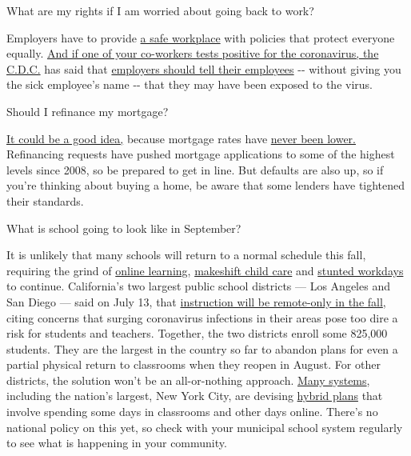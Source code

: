  What are my rights if I am worried about going back to work?

Employers have to provide
\href{https://www.osha.gov/SLTC/covid-19/standards.html}{a safe
workplace} with policies that protect everyone equally.
\href{https://www.nytimes.com/article/coronavirus-money-unemployment.html}{And
if one of your co-workers tests positive for the coronavirus, the
C.D.C.} has said that
\href{https://www.cdc.gov/coronavirus/2019-ncov/community/guidance-business-response.html}{employers
should tell their employees} -\/- without giving you the sick employee's
name -\/- that they may have been exposed to the virus.

 Should I refinance my mortgage?

\href{https://www.nytimes.com/article/coronavirus-money-unemployment.html}{It
could be a good idea,} because mortgage rates have
\href{https://www.nytimes.com/2020/07/16/business/mortgage-rates-below-3-percent.html}{never
been lower.} Refinancing requests have pushed mortgage applications to
some of the highest levels since 2008, so be prepared to get in line.
But defaults are also up, so if you're thinking about buying a home, be
aware that some lenders have tightened their standards.

 What is school going to look like in September?

It is unlikely that many schools will return to a normal schedule this
fall, requiring the grind of
\href{https://www.nytimes.com/2020/06/05/us/coronavirus-education-lost-learning.html}{online
learning},
\href{https://www.nytimes.com/2020/05/29/us/coronavirus-child-care-centers.html}{makeshift
child care} and
\href{https://www.nytimes.com/2020/06/03/business/economy/coronavirus-working-women.html}{stunted
workdays} to continue. California's two largest public school districts
--- Los Angeles and San Diego --- said on July 13, that
\href{https://www.nytimes.com/2020/07/13/us/lausd-san-diego-school-reopening.html}{instruction
will be remote-only in the fall}, citing concerns that surging
coronavirus infections in their areas pose too dire a risk for students
and teachers. Together, the two districts enroll some 825,000 students.
They are the largest in the country so far to abandon plans for even a
partial physical return to classrooms when they reopen in August. For
other districts, the solution won't be an all-or-nothing approach.
\href{https://bioethics.jhu.edu/research-and-outreach/projects/eschool-initiative/school-policy-tracker/}{Many
systems}, including the nation's largest, New York City, are devising
\href{https://www.nytimes.com/2020/06/26/us/coronavirus-schools-reopen-fall.html}{hybrid
plans} that involve spending some days in classrooms and other days
online. There's no national policy on this yet, so check with your
municipal school system regularly to see what is happening in your
community.

